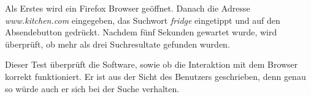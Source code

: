 Als Erstes wird ein Firefox Browser geöffnet. Danach die Adresse \textit{www.kitchen.com} eingegeben, das Suchwort \textit{fridge} eingetippt und auf den Absendebutton gedrückt. Nachdem fünf Sekunden gewartet wurde, wird überprüft, ob mehr als drei Suchresultate gefunden wurden.

Dieser Test überprüft die Software, sowie ob die Interaktion mit dem Browser korrekt funktioniert. Er ist aus der Sicht des Benutzers geschrieben, denn genau so würde auch er sich bei der Suche verhalten.